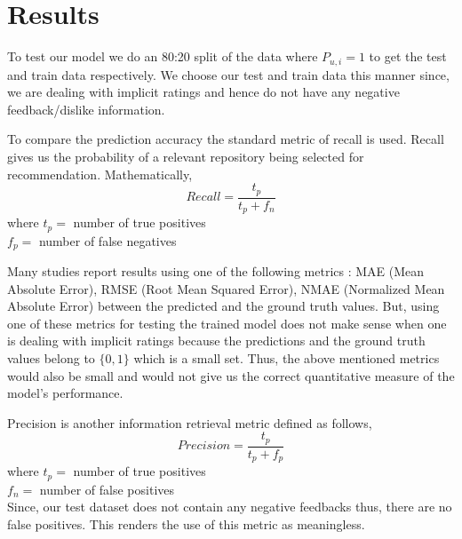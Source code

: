 \documentclass[conference]{IEEEtran}
\begin{document}
\section{\textbf{Results}}
To test our model we do an 80:20 split of the data where $P_{u,i} = 1$ to get the test and train data respectively. We choose our test and train data this manner since, we are dealing with implicit ratings and hence do not have any negative feedback/dislike information.

To compare the prediction accuracy the standard metric of recall is used. Recall gives us the probability of a relevant repository being selected for recommendation. Mathematically,
    \[ Recall = \frac{t_p}{t_p + f_n} \]
\hspace{0.5in} where $t_p = $ number of true positives \\
\hspace*{0.85in} $f_p = $ number of false negatives

Many studies report results using one of the following metrics : MAE (Mean Absolute Error), RMSE (Root Mean Squared Error), NMAE (Normalized Mean Absolute Error) between the predicted and the ground truth values. But, using one of these metrics for testing the trained model does not make sense when one is dealing with implicit ratings because the predictions and the ground truth values belong to $\{0, 1\}$ which is a small set. Thus, the above mentioned metrics would also be small and would not give us the correct quantitative measure of the model's performance.

Precision is another information retrieval metric defined as follows,
    \[ Precision = \frac{t_p}{t_p + f_p} \]
\hspace{0.5in} where $t_p = $ number of true positives \\
\hspace*{0.85in} $f_n = $ number of false positives\\
Since, our test dataset does not contain any negative feedbacks thus, there are no false positives. This renders the use of this metric as meaningless. 
\end{document}
